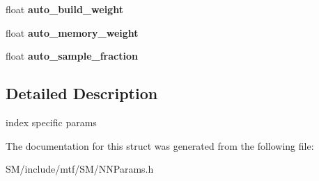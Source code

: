 \begin{DoxyCompactItemize}
\item 
\hypertarget{structmtf_1_1FLANNParams_ab990d82850ecb4eef548927915da5755}{float {\bfseries auto\-\_\-build\-\_\-weight}}\label{structmtf_1_1FLANNParams_ab990d82850ecb4eef548927915da5755}

\item 
\hypertarget{structmtf_1_1FLANNParams_a21fb9dce895d4798adcf9cd94f0f9780}{float {\bfseries auto\-\_\-memory\-\_\-weight}}\label{structmtf_1_1FLANNParams_a21fb9dce895d4798adcf9cd94f0f9780}

\item 
\hypertarget{structmtf_1_1FLANNParams_acd821c0d9046f4963ee254b7e59218f0}{float {\bfseries auto\-\_\-sample\-\_\-fraction}}\label{structmtf_1_1FLANNParams_acd821c0d9046f4963ee254b7e59218f0}

\end{DoxyCompactItemize}


\subsection{Detailed Description}
index specific params 

The documentation for this struct was generated from the following file\-:\begin{DoxyCompactItemize}
\item 
S\-M/include/mtf/\-S\-M/N\-N\-Params.\-h\end{DoxyCompactItemize}
